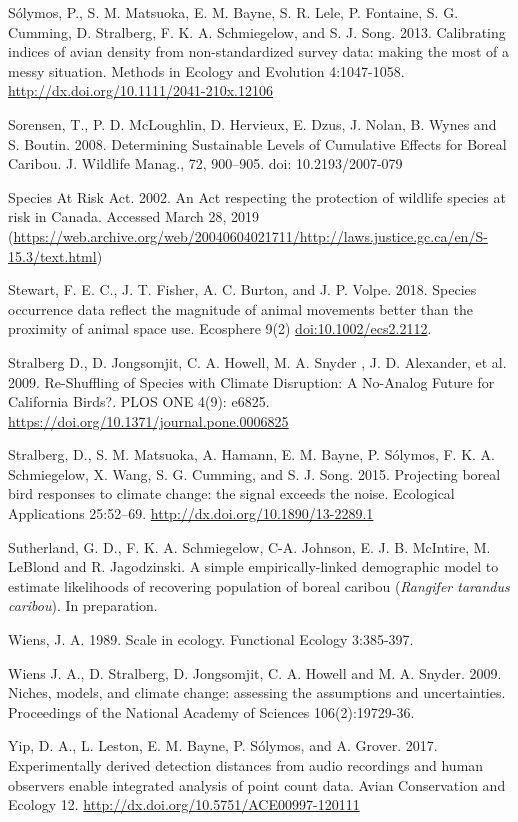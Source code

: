 \documentclass[]{article}
\begin{document}
Sólymos, P., S. M. Matsuoka, E. M. Bayne, S. R. Lele, P. Fontaine, S. G.
Cumming, D. Stralberg, F. K. A. Schmiegelow, and S. J. Song. 2013.
Calibrating indices of avian density from non-standardized survey data:
making the most of a messy situation. Methods in Ecology and Evolution
4:1047-1058. \url{http://dx.doi.org/10.1111/2041-210x.12106}

Sorensen, T., P. D. McLoughlin, D. Hervieux, E. Dzus, J. Nolan, B. Wynes
and S. Boutin. 2008. Determining Sustainable Levels of Cumulative
Effects for Boreal Caribou. J. Wildlife Manag., 72, 900--905. doi:
10.2193/2007-079

Species At Risk Act. 2002. An Act respecting the protection of wildlife
species at risk in Canada. Accessed March 28, 2019
(\url{https://web.archive.org/web/20040604021711/http://laws.justice.gc.ca/en/S-15.3/text.html})

Stewart, F. E. C., J. T. Fisher, A. C. Burton, and J. P. Volpe. 2018.
Species occurrence data reflect the magnitude of animal movements better
than the proximity of animal space use. Ecosphere 9(2)
\url{doi:10.1002/ecs2.2112}.

Stralberg D., D. Jongsomjit, C. A. Howell, M. A. Snyder , J. D.
Alexander, et al. 2009. Re-Shuffling of Species with Climate Disruption:
A No-Analog Future for California Birds?. PLOS ONE 4(9): e6825.
\url{https://doi.org/10.1371/journal.pone.0006825}

Stralberg, D., S. M. Matsuoka, A. Hamann, E. M. Bayne, P. Sólymos, F. K.
A. Schmiegelow, X. Wang, S. G. Cumming, and S. J. Song. 2015. Projecting
boreal bird responses to climate change: the signal exceeds the noise.
Ecological Applications 25:52--69.
\url{http://dx.doi.org/10.1890/13-2289.1}

Sutherland, G. D., F. K. A. Schmiegelow, C-A. Johnson, E. J. B.
McIntire, M. LeBlond and R. Jagodzinski. A simple empirically-linked
demographic model to estimate likelihoods of recovering population of
boreal caribou (\emph{Rangifer tarandus caribou}). In preparation.

Wiens, J. A. 1989. Scale in ecology. Functional Ecology 3:385-397.

Wiens J. A., D. Stralberg, D. Jongsomjit, C. A. Howell and M. A. Snyder.
2009. Niches, models, and climate change: assessing the assumptions and
uncertainties. Proceedings of the National Academy of Sciences
106(2):19729-36.

Yip, D. A., L. Leston, E. M. Bayne, P. Sólymos, and A. Grover. 2017.
Experimentally derived detection distances from audio recordings and
human observers enable integrated analysis of point count data. Avian
Conservation and Ecology 12.
\url{http://dx.doi.org/10.5751/ACE00997-120111}
\end{document}
